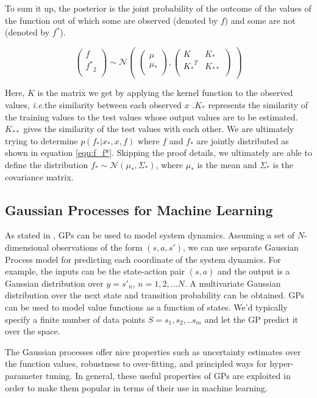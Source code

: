 \documentclass[12pt]{report}
\newcommand{\ie}{\textit{i.e.}}
\begin{document}
To sum it up, the posterior is the joint probability of the outcome of the values of the function out of which some are observed (denoted by $f$) and some are not (denoted by $f^*$). 

\begin{equation}
\label{equ:f_f*}
\begin{pmatrix}f\\
{f^*}_2\\
\end{pmatrix} 
\sim \mathcal{N}\begin{pmatrix} 
\begin{pmatrix}\mu\\
\mu_*\\
\end{pmatrix} ,\begin{pmatrix}K & K_*\\
{K_*}^T & K_{**}\\
\end{pmatrix} 
\end{pmatrix}
\end{equation}

Here, $K$ is the matrix we get by applying the kernel function to the observed values, \ie the similarity between each observed $x$ .$K_*$ represents the similarity of the training values to the test values whose output values are to be estimated. $K_{**}$ gives the similarity of the test values with each other. We are ultimately trying to determine $p(f_*|x_*,x,f)$ where $f$ and $f_*$ are jointly distributed as shown in equation \ref{equ:f_f*}. {\color{red}Skipping the proof details}, we ultimately are able to define the distribution $f_* \sim \mathcal{N} (\mu_*,\Sigma_*)$, where $\mu_*$ is the mean and $\Sigma_*$ is the covariance matrix.

\subsection{Gaussian Processes for Machine Learning}
As stated in \cite{rasmussen2003gaussian}, GPs can be used to model system dynamics. Assuming a set of $N$-dimensional observations of the form $(s,a,s')$, we can use separate Gaussian Process model for predicting each coordinate of the system dynamics. For example, the inputs can be the state-action pair $(s,a)$ and the output is a Gaussian distribution over $y = s'_n$, $n = 1,2,...N$. A multivariate Gaussian distribution over the next state and transition probability can be obtained. GPs can be used to model value functions as a function of states. We'd typically specify a finite number of data points $S=s_1,s_2,..s_m$ and let the GP predict it over the space. \par 
The Gaussian processes offer nice properties such as uncertainty estimates over the function values, robustness to over-fitting, and principled ways for hyper-parameter tuning. In general, these useful properties of GPs are exploited in order to make them popular in terms of their use in machine learning. 
 
\end{document}
